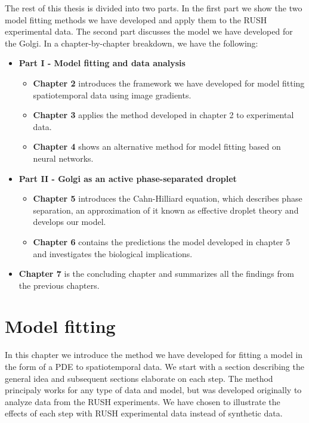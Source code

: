 \documentclass{Dissertate}
\providecommand{\tightlist}{%
  \setlength{\itemsep}{0pt}\setlength{\parskip}{0pt}}
\begin{document}
The rest of this thesis is divided into two parts. In the first part we
show the two model fitting methods we have developed and apply them to
the RUSH experimental data. The second part discusses the model we have
developed for the Golgi. In a chapter-by-chapter breakdown, we have the
following:

\begin{itemize}
\tightlist
\item
  \textbf{Part I - Model fitting and data analysis}

  \begin{itemize}
  \tightlist
  \item
    \textbf{Chapter 2} introduces the framework we have developed for
    model fitting spatiotemporal data using image gradients.
  \item
    \textbf{Chapter 3} applies the method developed in chapter 2 to
    experimental data.
  \item
    \textbf{Chapter 4} shows an alternative method for model fitting
    based on neural networks.
  \end{itemize}
\item
  \textbf{Part II - Golgi as an active phase-separated droplet }

  \begin{itemize}
  \tightlist
  \item
    \textbf{Chapter 5} introduces the Cahn-Hilliard equation, which
    describes phase separation, an approximation of it known as
    effective droplet theory and develops our model.
  \item
    \textbf{Chapter 6} contains the predictions the model developed in
    chapter 5 and investigates the biological implications.
  \end{itemize}
\item
  \textbf{Chapter 7} is the concluding chapter and summarizes all the
  findings from the previous chapters.
\end{itemize}

\hypertarget{model-fitting}{%
\chapter{Model fitting}\label{model-fitting}}

In this chapter we introduce the method we have developed for fitting a
model in the form of a PDE to spatiotemporal data. We start with a
section describing the general idea and subsequent sections elaborate on
each step. The method principaly works for any type of data and model,
but was developed originally to analyze data from the RUSH experiments.
We have chosen to illustrate the effects of each step with RUSH
experimental data instead of synthetic data.
\end{document}
